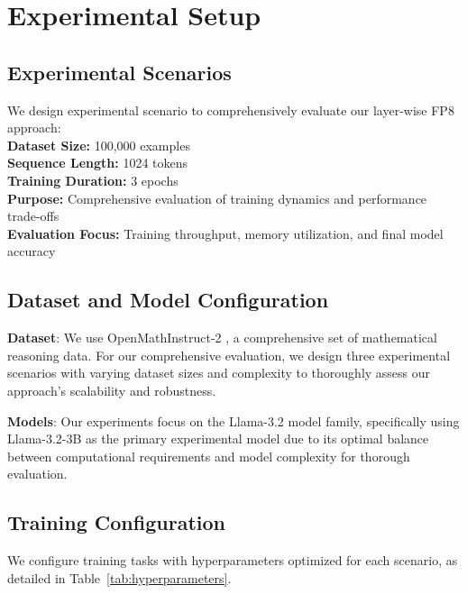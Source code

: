 \documentclass[conference]{IEEEtran}
\begin{document}
\section{Experimental Setup}

\subsection{Experimental Scenarios}

We design experimental scenario to comprehensively evaluate our layer-wise FP8 approach:\\
\textbf{Dataset Size:} 100,000 examples\\
\textbf{Sequence Length:} 1024 tokens\\
\textbf{Training Duration:} 3 epochs\\
\textbf{Purpose:} Comprehensive evaluation of training dynamics and performance trade-offs\\
\textbf{Evaluation Focus:} Training throughput, memory utilization, and final model accuracy
\subsection{Dataset and Model Configuration}
\textbf{Dataset}: We use OpenMathInstruct-2 \cite{toshniwal2024openmath2}, a comprehensive set of mathematical reasoning data. For our comprehensive evaluation, we design three experimental scenarios with varying dataset sizes and complexity to thoroughly assess our approach's scalability and robustness.

\textbf{Models}: Our experiments focus on the Llama-3.2 model family, specifically using Llama-3.2-3B as the primary experimental model due to its optimal balance between computational requirements and model complexity for thorough evaluation.

\subsection{Training Configuration}

We configure training tasks with hyperparameters optimized for each scenario, as detailed in Table~\ref{tab:hyperparameters}.
\end{document}
